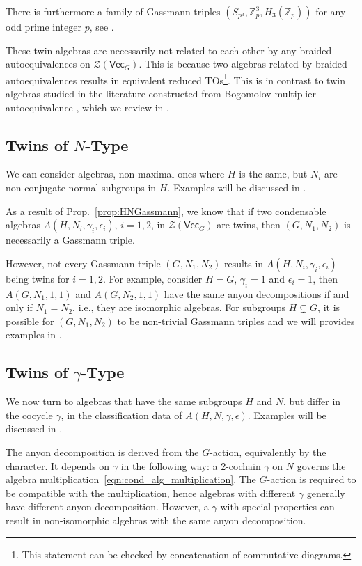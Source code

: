 \documentclass[aps,twocolumn,prx,floatfix,preprintnumbers, nofootinbib,10pt]{revtex4-2}
\numberwithin{equation}{section}
\theoremstyle{definition}
\newcommand{\Z}{{\mathbb Z}}
\newcommand{\cZ}{\mathcal{Z}}
\renewcommand{\Vec}{\mathsf{Vec}}
\newcommand{\eps}{\epsilon}
\begin{document}
There is furthermore a family of Gassmann triples $(S_{p^3}, \Z_p^3, H_3(\Z_p))$ for any odd prime integer $p$, see .

These twin algebras are necessarily not related to each other by any braided autoequivalences on $\cZ(\Vec_G)$. This is because two algebras related by braided autoequivalences results in equivalent reduced TOs\footnote{This statement can be checked by concatenation of commutative diagrams.}. This is in contrast to twin algebras studied in the literature constructed from Bogomolov-multiplier autoequivalence \cite{Pollmann:2012,Davydov:2013xov, Cong:2017ffh, Kobayashi:2025ykb,Kobayashi:2025pxs}, which we review in .

\subsection{Twins of $N$-Type}

We can consider algebras, non-maximal ones where $H$ is the same, but $N_i$ are non-conjugate normal subgroups in $H$. Examples will be discussed in .

{As a result of Prop.~\ref{prop:HNGassmann}, we know that if two condensable algebras $A(H, N_i,\gamma_i,\epsilon_i)$, $i=1,2$, in $\cZ(\Vec_G)$ are twins, then $(G,N_1,N_2)$ is necessarily a Gassmann triple.

However, not every Gassmann triple $(G, N_1, N_2)$ results in $A(H, N_i,\gamma_i, \epsilon_i)$ being twins for $i=1,2$. For example, consider  $H=G$, $\gamma_i=1$ and $\epsilon_i=1$, then $A(G, N_1,1,1)$ and $A(G, N_2, 1,1)$ have the same anyon decompositions if and only if $N_1=N_2$, i.e., they are isomorphic algebras. For subgroups $H\subsetneq G$, it is possible for $(G, N_1, N_2)$ to be non-trivial Gassmann triples and we will provides examples in .}



\subsection{Twins of $\gamma$-Type}
\label{sec:SPT-twins}

We now turn to algebras that have the same subgroups $H$ and $N$, but differ in the cocycle $\gamma$, in the classification data of $A(H,N,\gamma,\eps)$. 
Examples will be discussed in .

The anyon decomposition is derived from the $G$-action, equivalently by the character. It depends on $\gamma$ in the following way: a 2-cochain $\gamma$ on $N$ governs the algebra multiplication~\eqref{eqn:cond_alg_multiplication}. The $G$-action is required to be compatible with the multiplication, hence algebras with different $\gamma$ generally have different anyon decomposition. However, a $\gamma$ with special properties can result in non-isomorphic algebras with the same anyon decomposition.
\end{document}
